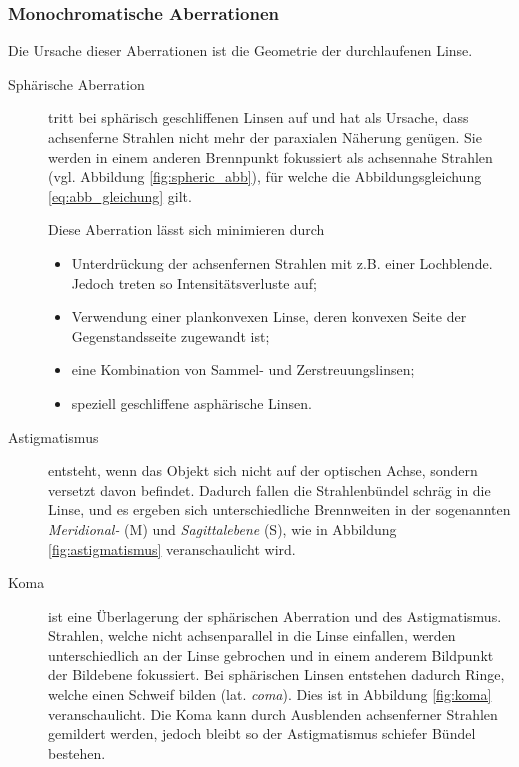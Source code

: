 \subsubsection{Monochromatische Aberrationen}	\vspace{-1ex}
Die Ursache dieser Aberrationen ist die Geometrie der {\marker durchlaufenen} Linse.

\begin{description}
\item[Sphärische Aberration] tritt bei sphärisch geschliffenen Linsen auf und hat als Ursache, dass achsenferne Strahlen nicht mehr der paraxialen Näherung genügen. Sie werden in einem anderen Brennpunkt fokussiert als achsennahe Strahlen (vgl. Abbildung \ref{fig:spheric_abb}), für welche die Abbildungsgleichung \eqref{eq:abb_gleichung} gilt.

Diese Aberration lässt sich minimieren durch
\begin{itemize} \itemsep-1ex
	\item Unterdrückung der achsenfernen Strahlen mit z.B. einer Lochblende. Jedoch treten so Intensitätsverluste auf;
	\item Verwendung einer plankonvexen Linse, deren konvexen Seite der Gegenstandsseite zugewandt ist;
	\item eine Kombination von Sammel- und Zerstreuungslinsen;
	\item speziell geschliffene asphärische Linsen.
\end{itemize}

\item[Astigmatismus] entsteht, wenn das Objekt sich nicht auf der optischen Achse, sondern versetzt davon befindet. Dadurch fallen die Strahlenbündel schräg in die Linse, und es ergeben sich unterschiedliche Brennweiten in der sogenannten \emph{Meridional-} (M) und \emph{Sagittalebene} (S), wie in Abbildung \ref{fig:astigmatismus} veranschaulicht wird.

\item[Koma] ist eine Überlagerung der sphärischen Aberration und des Astigmatismus. Strahlen, welche nicht achsenparallel in die Linse einfallen, werden unterschiedlich an der Linse gebrochen und in einem anderem Bildpunkt der Bildebene fokussiert. Bei sphärischen Linsen entstehen dadurch Ringe, welche einen Schweif bilden (lat. \emph{coma}). Dies ist in Abbildung \ref{fig:koma} veranschaulicht. Die Koma kann durch Ausblenden achsenferner Strahlen gemildert werden, jedoch bleibt so der Astigmatismus schiefer Bündel bestehen.
\end{description}

